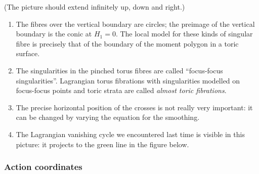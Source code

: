 \documentclass{article}
\begin{document}
\begin{center}
\end{center}
(The picture should extend infinitely up, down and right.)


\begin{Remark}\label{rmk:almosttoric}
\begin{enumerate}
\item The fibres over the vertical boundary are circles; the preimage of
the vertical boundary is the conic at \(H_1=0\). The local model
for these kinds of singular fibre is precisely that of the
boundary of the moment polygon in a toric surface.


\item The singularities in the pinched torus fibres are called
``focus-focus singularities''. Lagrangian torus fibrations with
singularities modelled on focus-focus points and toric strata are
called {\em almost toric fibrations}.


\item The precise horizontal position of the crosses is not really very
important: it can be changed by varying the equation for the
smoothing.


\item The Lagrangian vanishing cycle we encountered last time is visible
in this picture: it projects to the green line in the figure
below.


\end{enumerate}
\end{Remark}
\begin{center}
\end{center}
\subsubsection{Action coordinates}
\end{document}
